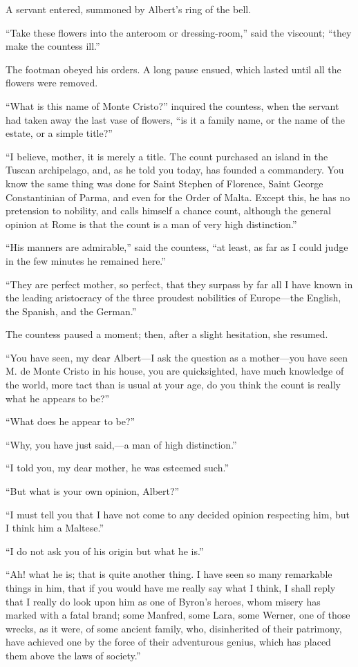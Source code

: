 A servant entered, summoned by Albert’s ring of the bell.

“Take these flowers into the anteroom or dressing-room,” said the
viscount; “they make the countess ill.”

The footman obeyed his orders. A long pause ensued, which lasted until
all the flowers were removed.

“What is this name of Monte Cristo?” inquired the countess, when the
servant had taken away the last vase of flowers, “is it a family name,
or the name of the estate, or a simple title?”

“I believe, mother, it is merely a title. The count purchased an island
in the Tuscan archipelago, and, as he told you today, has founded a
commandery. You know the same thing was done for Saint Stephen of
Florence, Saint George Constantinian of Parma, and even for the Order
of Malta. Except this, he has no pretension to nobility, and calls
himself a chance count, although the general opinion at Rome is that
the count is a man of very high distinction.”

“His manners are admirable,” said the countess, “at least, as far as I
could judge in the few minutes he remained here.”

“They are perfect mother, so perfect, that they surpass by far all I
have known in the leading aristocracy of the three proudest nobilities
of Europe—the English, the Spanish, and the German.”

The countess paused a moment; then, after a slight hesitation, she
resumed.

“You have seen, my dear Albert—I ask the question as a mother—you have
seen M. de Monte Cristo in his house, you are quicksighted, have much
knowledge of the world, more tact than is usual at your age, do you
think the count is really what he appears to be?”

“What does he appear to be?”

“Why, you have just said,—a man of high distinction.”

“I told you, my dear mother, he was esteemed such.”

“But what is your own opinion, Albert?”

“I must tell you that I have not come to any decided opinion respecting
him, but I think him a Maltese.”

“I do not ask you of his origin but what he is.”

“Ah! what he is; that is quite another thing. I have seen so many
remarkable things in him, that if you would have me really say what I
think, I shall reply that I really do look upon him as one of Byron’s
heroes, whom misery has marked with a fatal brand; some Manfred, some
Lara, some Werner, one of those wrecks, as it were, of some ancient
family, who, disinherited of their patrimony, have achieved one by the
force of their adventurous genius, which has placed them above the laws
of society.”


